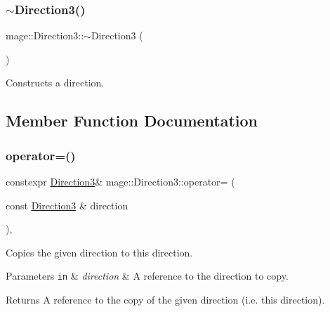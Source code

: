 \subsubsection{\texorpdfstring{$\sim$\+Direction3()}{~Direction3()}}
{\footnotesize\ttfamily mage\+::\+Direction3\+::$\sim$\+Direction3 (\begin{DoxyParamCaption}{ }\end{DoxyParamCaption})\hspace{0.3cm}{\ttfamily [default]}}

Constructs a direction. 

\subsection{Member Function Documentation}
\hypertarget{structmage_1_1_direction3_a500a363a93cded3e36a0704d288d34f3}{}\label{structmage_1_1_direction3_a500a363a93cded3e36a0704d288d34f3} 
\subsubsection{\texorpdfstring{operator=()}{operator=()}\hspace{0.1cm}{\footnotesize\ttfamily [1/2]}}
{\footnotesize\ttfamily constexpr \hyperlink{structmage_1_1_direction3}{Direction3}\& mage\+::\+Direction3\+::operator= (\begin{DoxyParamCaption}\item[{const \hyperlink{structmage_1_1_direction3}{Direction3} \&}]{direction }\end{DoxyParamCaption})\hspace{0.3cm}{\ttfamily [default]}, {\ttfamily [noexcept]}}

Copies the given direction to this direction.


\begin{DoxyParams}[1]{Parameters}
\mbox{\tt in}  & {\em direction} & A reference to the direction to copy. \\
\hline
\end{DoxyParams}
\begin{DoxyReturn}{Returns}
A reference to the copy of the given direction (i.\+e. this direction). 
\end{DoxyReturn}
\hypertarget{structmage_1_1_direction3_a111a8f8d7286bfba0d7586925666315b}{}\label{structmage_1_1_direction3_a111a8f8d7286bfba0d7586925666315b} 
